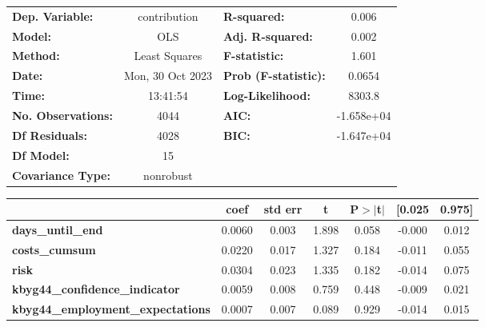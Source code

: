 \begin{center}
\begin{tabular}{lclc}
\toprule
\textbf{Dep. Variable:}                   &   contribution   & \textbf{  R-squared:         } &     0.006   \\
\textbf{Model:}                           &       OLS        & \textbf{  Adj. R-squared:    } &     0.002   \\
\textbf{Method:}                          &  Least Squares   & \textbf{  F-statistic:       } &     1.601   \\
\textbf{Date:}                            & Mon, 30 Oct 2023 & \textbf{  Prob (F-statistic):} &   0.0654    \\
\textbf{Time:}                            &     13:41:54     & \textbf{  Log-Likelihood:    } &    8303.8   \\
\textbf{No. Observations:}                &        4044      & \textbf{  AIC:               } & -1.658e+04  \\
\textbf{Df Residuals:}                    &        4028      & \textbf{  BIC:               } & -1.647e+04  \\
\textbf{Df Model:}                        &          15      & \textbf{                     } &             \\
\textbf{Covariance Type:}                 &    nonrobust     & \textbf{                     } &             \\
\bottomrule
\end{tabular}
\begin{tabular}{lcccccc}
                                          & \textbf{coef} & \textbf{std err} & \textbf{t} & \textbf{P$> |$t$|$} & \textbf{[0.025} & \textbf{0.975]}  \\
\midrule
\textbf{days\_until\_end}                 &       0.0060  &        0.003     &     1.898  &         0.058        &       -0.000    &        0.012     \\
\textbf{costs\_cumsum}                    &       0.0220  &        0.017     &     1.327  &         0.184        &       -0.011    &        0.055     \\
\textbf{risk}                             &       0.0304  &        0.023     &     1.335  &         0.182        &       -0.014    &        0.075     \\
\textbf{kbyg44\_confidence\_indicator}    &       0.0059  &        0.008     &     0.759  &         0.448        &       -0.009    &        0.021     \\
\textbf{kbyg44\_employment\_expectations} &       0.0007  &        0.007     &     0.089  &         0.929        &       -0.014    &        0.015     \\

\end{tabular}
\end{center}
